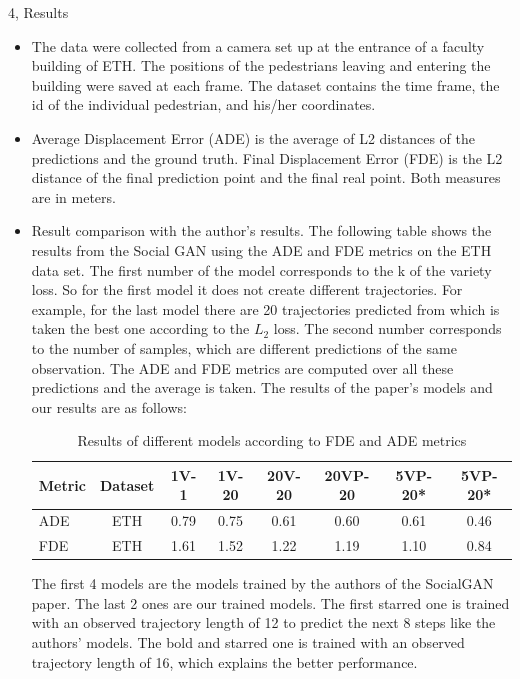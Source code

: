 \documentclass[10pt,a4paper]{article}
\begin{document}
\begin{task}{4, Results}

\begin{itemize}
    \item The data were collected from a camera set up at the entrance of a faculty building of ETH. The positions of the pedestrians leaving and entering the building were saved at each frame. The dataset contains the time frame, the id of the individual pedestrian, and his/her coordinates. \\
    \item Average Displacement Error (ADE) is the average of L2 distances of the predictions and the ground truth. Final Displacement Error (FDE) is the L2 distance of the final prediction point and the final real point. Both measures are in meters. \\
    \item Result comparison with the author's results.
    The following table shows the results from the Social GAN using the ADE and FDE metrics on the ETH data set.
    The first number of the model corresponds to the k of the variety loss. So for the first model it does not create different trajectories. For example, for the last model there are 20 trajectories predicted from which is taken the best one according to the $L_2$ loss. The second number corresponds to the number of samples, which are different predictions of the same observation. The ADE and FDE metrics are computed over all these predictions and the average is taken. The results of the paper's models and our results are as follows:\bigbreak
    \begin{table}[H]
        \centering
    \begin{tabular}{|l|c|c|c|c|c|c|c|}
    \hline
         \textbf{Metric}&\textbf{Dataset}&1V-1&1V-20&20V-20&20VP-20&5VP-20*&\textbf{5VP-20*}\\
         \hline
         ADE&ETH&0.79&0.75&0.61&0.60&0.61&0.46\\
         FDE&ETH&1.61&1.52&1.22&1.19&1.10&0.84\\
         \hline
    \end{tabular}
     \caption{Results of different models according to FDE and ADE metrics}
    \label{tab:results}
    \end{table}
    \bigbreak
   The first 4 models are the models trained by the authors of the SocialGAN paper. The last 2 ones are our trained models. The first starred one is trained with an observed trajectory length of 12 to predict the next 8 steps like the authors' models. The bold and starred one is trained with an observed trajectory length of 16, which explains the better performance.

\end{itemize}
\end{task}
\end{document}
